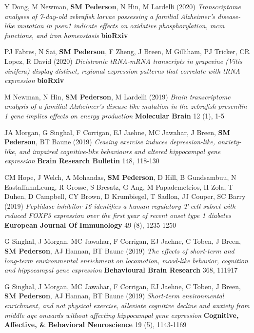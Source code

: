 \documentclass[11pt,a4paper,]{moderncv}
\begin{document}
\begin{modenumerate}
     \item Y Dong, M Newman, \textbf{SM Pederson}, N Hin, M Lardelli (2020) \emph{Transcriptome analyses of 7-day-old zebrafish larvae possessing a familial Alzheimer's disease-like mutation in psen1 indicate effects on oxidative phosphorylation, mcm functions, and iron homeostasis} \textbf{bioRxiv}  \\[-4mm] 
     \item PJ Fabres, N Sai, \textbf{SM Pederson}, F Zheng, J Breen, M Gilliham, PJ Tricker, CR Lopez, R David (2020) \emph{Dicistronic tRNA-mRNA transcripts in grapevine (Vitis vinifera) display distinct, regional expression patterns that correlate with tRNA expression} \textbf{bioRxiv}  \\[-4mm] 
     \item M Newman, N Hin, \textbf{SM Pederson}, M Lardelli (2019) \emph{Brain transcriptome analysis of a familial Alzheimer's disease-like mutation in the zebrafish presenilin 1 gene implies effects on energy production} \textbf{Molecular Brain} 12 (1), 1-5 \\[-4mm] 
     \item JA Morgan, G Singhal, F Corrigan, EJ Jaehne, MC Jawahar, J Breen, \textbf{SM Pederson}, BT Baune (2019) \emph{Ceasing exercise induces depression-like, anxiety-like, and impaired cognitive-like behaviours and altered hippocampal gene expression} \textbf{Brain Research Bulletin} 148, 118-130 \\[-4mm] 
     \item CM Hope, J Welch, A Mohandas, \textbf{SM Pederson}, D Hill, B Gundsambuu, N EastaffnnnLeung, R Grosse, S Bresatz, G Ang, M Papademetrios, H Zola, T Duhen, D Campbell, CY Brown, D Krumbiegel, T Sadlon, JJ Couper, SC Barry (2019) \emph{Peptidase inhibitor 16 identifies a human regulatory T-cell subset with reduced FOXP3 expression over the first year of recent onset type 1 diabetes} \textbf{European Journal Of Immunology} 49 (8), 1235-1250 \\[-4mm] 
     \item G Singhal, J Morgan, MC Jawahar, F Corrigan, EJ Jaehne, C Toben, J Breen, \textbf{SM Pederson}, AJ Hannan, BT Baune (2019) \emph{The effects of short-term and long-term environmental enrichment on locomotion, mood-like behavior, cognition and hippocampal gene expression} \textbf{Behavioural Brain Research} 368, 111917 \\[-4mm] 
     \item G Singhal, J Morgan, MC Jawahar, F Corrigan, EJ Jaehne, C Toben, J Breen, \textbf{SM Pederson}, AJ Hannan, BT Baune (2019) \emph{Short-term environmental enrichment, and not physical exercise, alleviate cognitive decline and anxiety from middle age onwards without affecting hippocampal gene expression} \textbf{Cognitive, Affective, \& Behavioral Neuroscience} 19 (5), 1143-1169 \\[-4mm] 

\end{modenumerate}
\end{document}
